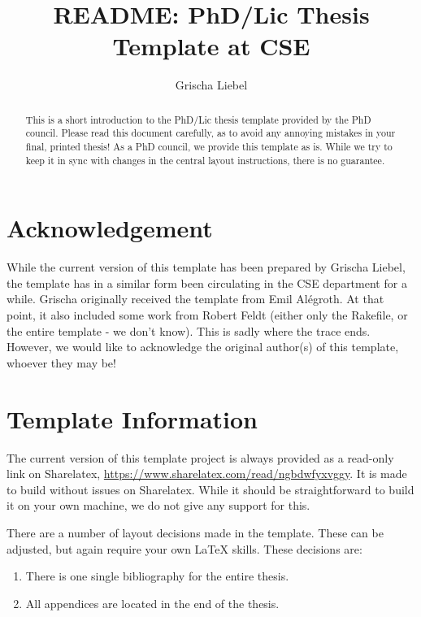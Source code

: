 \documentclass[a4paper,10pt]{article}
\title{README: PhD/Lic Thesis Template at CSE}
\author{Grischa Liebel}
\begin{document}
\maketitle

\begin{abstract}
This is a short introduction to the PhD/Lic thesis template provided by the PhD council.
Please read this document carefully, as to avoid any annoying mistakes in your final, printed thesis!
As a PhD council, we provide this template as is.
While we try to keep it in sync with changes in the central layout instructions, there is no guarantee.
\end{abstract}

\section{Acknowledgement}
While the current version of this template has been prepared by Grischa Liebel, the template has in a similar form been circulating in the CSE department for a while.
Grischa originally received the template from Emil Al\'{e}groth. At that point, it also included some work from Robert Feldt (either only the Rakefile, or the entire template - we don't know).
This is sadly where the trace ends.
However, we would like to acknowledge the original author(s) of this template, whoever they may be!

\section{Template Information}
The current version of this template project is always provided as a read-only link on Sharelatex, \url{https://www.sharelatex.com/read/ngbdwfyxvggy}.
%
It is made to build without issues on Sharelatex.
While it should be straightforward to build it on your own machine, we do not give any support for this.

There are a number of layout decisions made in the template.
These can be adjusted, but again require your own LaTeX skills.
These decisions are:
\begin{enumerate}
    \item There is one single bibliography for the entire thesis.
    \item All appendices are located in the end of the thesis.
\end{enumerate}
\end{document}
